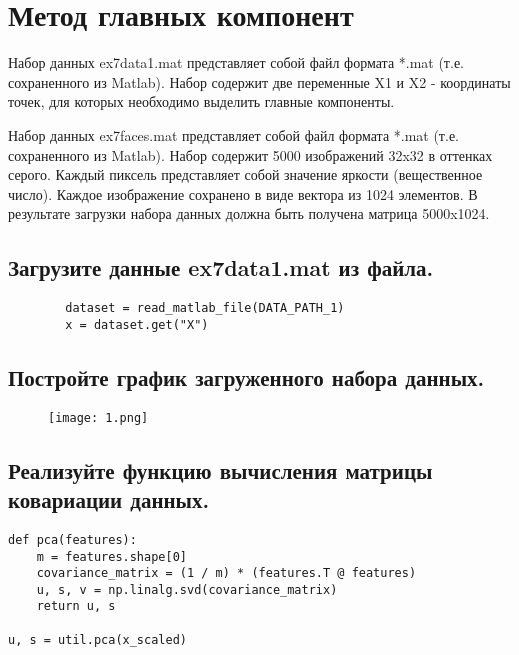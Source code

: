 







\section{Метод главных компонент}
\label{sec:purpose}

Набор данных ex7data1.mat представляет собой файл формата *.mat (т.е. сохраненного из Matlab). Набор содержит две переменные X1 и X2 - координаты точек, для которых необходимо выделить главные компоненты.

Набор данных ex7faces.mat представляет собой файл формата *.mat (т.е. сохраненного из Matlab). Набор содержит 5000 изображений 32x32 в оттенках серого. Каждый пиксель представляет собой значение яркости (вещественное число). Каждое изображение сохранено в виде вектора из 1024 элементов. В результате загрузки набора данных должна быть получена матрица 5000x1024.


\subsection{Загрузите данные ex7data1.mat из файла.}

\begin{lstlisting}
        dataset = read_matlab_file(DATA_PATH_1)
        x = dataset.get("X")
\end{lstlisting}

\subsection{Постройте график загруженного набора данных.}

\begin{figure}[h]
\centering
    \texttt{[image: 1.png]}
  \label{sec:purpose:payings}
\end{figure}

\subsection{Реализуйте функцию вычисления матрицы ковариации данных.}


\begin{lstlisting}
def pca(features):
    m = features.shape[0]
    covariance_matrix = (1 / m) * (features.T @ features)
    u, s, v = np.linalg.svd(covariance_matrix)
    return u, s

u, s = util.pca(x_scaled)
\end{lstlisting}

